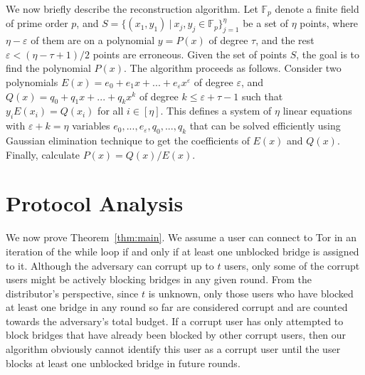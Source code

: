 \documentclass{llncs}
\newcommand{\fullpaper}[1]{#1}
\newcommand{\fullpaper}[1]{}
\newcommand{\algFont}{\fontsize{10}{13}\selectfont}
\newcommand{\sfsize}{\fontsize{0.73\baselineskip}{0.73\baselineskip}\selectfont}
\newcommand{\sans}[1]{\textsf{\sfsize \mbox{#1}}}
\newcommand{\brix}{\sans{TorBrix}\xspace}
\begin{document}
\fullpaper{We now briefly describe the reconstruction algorithm. Let $\mathbb{F}_{p}$ denote a finite field of prime order $p$, and $S=\{(x_{1},y_{1})\:|\:x_{j},y_{j}\in\mathbb{F}_{p}\}_{j=1}^{\eta}$ be a set of $\eta$ points, where $\eta-\varepsilon$ of them are on a polynomial $y=P(x)$ of degree $\tau$, and the rest $\varepsilon<(\eta-\tau+1)/2$ points are erroneous. Given the set of points $S$, the goal is to find the polynomial $P(x)$. The algorithm proceeds as follows. Consider two polynomials $E(x)=e_{0}+e_{1}x+...+e_{\varepsilon}x^{\varepsilon}$ of degree $\varepsilon$, and $Q(x)=q_{0}+q_{1}x+...+q_{k}x^{k}$ of degree $k\leq\varepsilon+\tau-1$ such that $y_{i}E(x_{i})=Q(x_{i})$ for all $i\in[\eta]$. This defines a system of $\eta$ linear equations with $\varepsilon+k=\eta$ variables $e_{0},...,e_{\varepsilon},q_{0},...,q_{k}$ that can be solved efficiently using Gaussian elimination technique to get the coefficients of $E(x)$ and $Q(x)$. Finally, calculate $P(x)=Q(x)/E(x)$.}

%	

\section{Protocol Analysis} \label{sec:ProofBasic}
We now prove Theorem~\ref{thm:main}. 
We assume a user can connect to Tor in an iteration of the while loop if and only if at least one unblocked bridge is assigned to it. 
Although the adversary can corrupt up to $t$ users, only some of the corrupt users might be actively blocking bridges in any given round. From the distributor's perspective, since $t$ is unknown, only those users who have blocked at least one bridge in any round so far are considered corrupt and are counted towards the adversary's total budget. If a corrupt user has only attempted to block bridges that have already been blocked by other corrupt users, then our algorithm obviously cannot identify this user as a corrupt user until the user blocks at least one unblocked bridge in future rounds.
 
\end{document}
